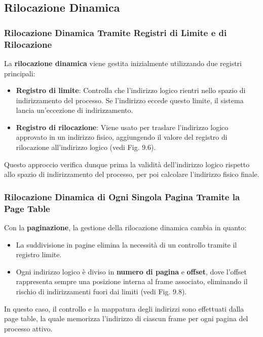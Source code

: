 
\subsection{Rilocazione Dinamica}

\subsubsection{Rilocazione Dinamica Tramite Registri di Limite e di Rilocazione}
La \textbf{rilocazione dinamica} viene gestita inizialmente utilizzando due registri principali:
\begin{itemize}
    \item \textbf{Registro di limite}: Controlla che l’indirizzo logico rientri nello spazio di indirizzamento del processo. Se l’indirizzo eccede questo limite, il sistema lancia un’eccezione di indirizzamento.
    \item \textbf{Registro di rilocazione}: Viene usato per traslare l’indirizzo logico approvato in un indirizzo fisico, aggiungendo il valore del registro di rilocazione all’indirizzo logico (vedi Fig. 9.6).
\end{itemize}

Questo approccio verifica dunque prima la validità dell'indirizzo logico rispetto allo spazio di indirizzamento del processo, per poi calcolare l’indirizzo fisico finale.

\subsubsection{Rilocazione Dinamica di Ogni Singola Pagina Tramite la Page Table}
Con la \textbf{paginazione}, la gestione della rilocazione dinamica cambia in quanto:
\begin{itemize}
    \item La suddivisione in pagine elimina la necessità di un controllo tramite il registro limite. 
    \item Ogni indirizzo logico è diviso in \textbf{numero di pagina} e \textbf{offset}, dove l’offset rappresenta sempre una posizione interna al frame associato, eliminando il rischio di indirizzamenti fuori dai limiti (vedi Fig. 9.8).
\end{itemize}

In questo caso, il controllo e la mappatura degli indirizzi sono effettuati dalla page table, la quale memorizza l’indirizzo di ciascun frame per ogni pagina del processo attivo.
